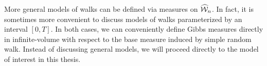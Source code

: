 More general models of walks can be defined via measures on $\widehat{\mathcal{W}}_n$. In fact,
it is sometimes more convenient to discuss models of walks parameterized by an
interval $[0, T]$. In both cases, we can conveniently define Gibbs measures
directly in infinite-volume with respect to the base measure induced by simple
random walk. Instead of discussing general models, we will proceed directly to
the model of interest in this thesis.




